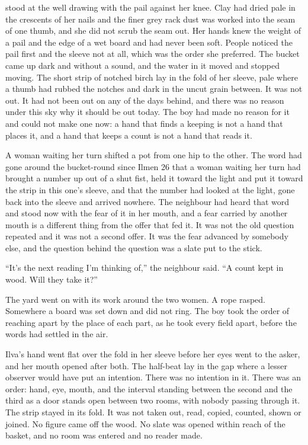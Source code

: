  stood at the well drawing with the pail against her knee. Clay had dried pale in the crescents of her nails and the finer grey rack dust was worked into the seam of one thumb, and she did not scrub the seam out. Her hands knew the weight of a pail and the edge of a wet board and had never been soft. People noticed the pail first and the sleeve not at all, which was the order she preferred. The bucket came up dark and without a sound, and the water in it moved and stopped moving. The short strip of notched birch lay in the fold of her sleeve, pale where a thumb had rubbed the notches and dark in the uncut grain between. It was not out. It had not been out on any of the days behind, and there was no reason under this sky why it should be out today. The boy had made no reason for it and could not make one now: a hand that finds a keeping is not a hand that places it, and a hand that keeps a count is not a hand that reads it.

A woman waiting her turn shifted a pot from one hip to the other. The word had gone around the bucket-round since Ilmen 26 that a woman waiting her turn had brought a number up out of a shut fist, held it toward the light and put it toward the strip in this one's sleeve, and that the number had looked at the light, gone back into the sleeve and arrived nowhere. The neighbour had heard that word and stood now with the fear of it in her mouth, and a fear carried by another mouth is a different thing from the offer that fed it. It was not the old question repeated and it was not a second offer. It was the fear advanced by somebody else, and the question behind the question was a slate put to the stick.

“It's the next reading I'm thinking of,” the neighbour said. “A count kept in wood. Will they take it?”

The yard went on with its work around the two women. A rope rasped. Somewhere a board was set down and did not ring. The boy took the order of reaching apart by the place of each part, as he took every field apart, before the words had settled in the air.

Ilva's hand went flat over the fold in her sleeve before her eyes went to the asker, and her mouth opened after both. The half-beat lay in the gap where a lesser observer would have put an intention. There was no intention in it. There was an order: hand, eye, mouth, and the interval standing between the second and the third as a door stands open between two rooms, with nobody passing through it. The strip stayed in its fold. It was not taken out, read, copied, counted, shown or joined. No figure came off the wood. No slate was opened within reach of the basket, and no room was entered and no reader made.

